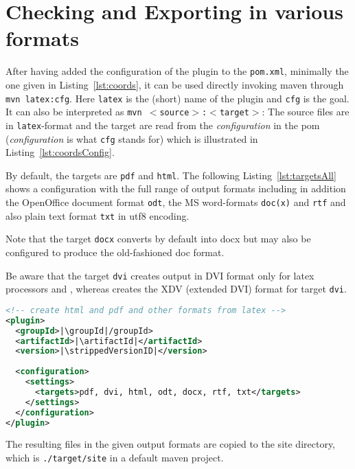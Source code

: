 \section{Checking and Exporting in various formats}\label{sec:outputFormats}


After having added the configuration of the plugin to the \texttt{pom.xml},
minimally the one given in Listing~\ref{lst:coords},
it can be used directly invoking maven through 
\texttt{mvn latex:cfg}. 
Here \texttt{latex} is the (short) name of the plugin 
and \texttt{cfg} is the goal. 
It can also be interpreted as \texttt{mvn $<$source$>$:$<$target$>$}: 
The source files are in \texttt{latex}-format and the target 
are read from the \emph{configuration} in the pom 
(\emph{configuration} is what \texttt{cfg} stands for) 
which is illustrated in Listing~\ref{lst:coordsConfig}. 

By default, the targets are \texttt{pdf} and \texttt{html}. 
The following Listing~\ref{lst:targetsAll} shows a configuration 
with the full range of output formats including in addition 
the OpenOffice document format \texttt{odt}, 
the MS word-formats \texttt{doc(x)} and \texttt{rtf} %
and also plain text format \texttt{txt} in utf8 encoding. 

Note that the target \texttt{docx} converts by default into \gls{docx} 
but may also be configured to produce the old-fashioned \gls{doc} format. 

Be aware that the target \texttt{dvi} creates output in DVI format 
only for latex processors \lualatex{} and \pdflatex{}, 
whereas \xelatex{} creates the XDV (extended DVI) format for target \texttt{dvi}. 

\begin{lstlisting}[language=xml, basicstyle=\small,
escapechar=|,
float, captionpos=b, label={lst:targetsAll}, 
caption={Configuration with full range output formats}]
<!-- create html and pdf and other formats from latex -->
<plugin>
  <groupId>|\groupId|/groupId>
  <artifactId>|\artifactId|</artifactId>
  <version>|\strippedVersionID|</version>
	
  <configuration>
    <settings>
      <targets>pdf, dvi, html, odt, docx, rtf, txt</targets>
    </settings>
  </configuration>
</plugin>
\end{lstlisting}

The resulting files in the given output formats 
are copied to the site directory, 
which is \texttt{./target/site} in a default maven project. 

